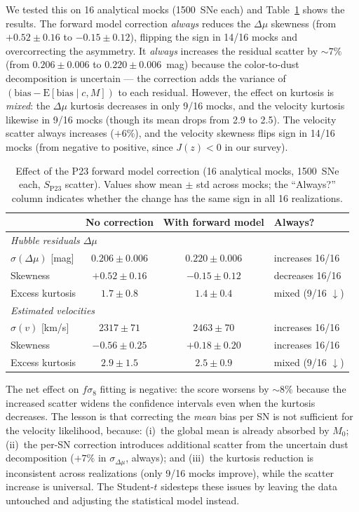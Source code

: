 \documentclass[fleqn,usenatbib]{mnras}
\begin{document}
We tested this on 16 analytical mocks (1500~SNe each) and
Table~\ref{tab:fwd_correction} shows the results. The forward
model correction \emph{always} reduces the $\Delta\mu$ skewness
(from $+0.52 \pm 0.16$ to $-0.15 \pm 0.12$), flipping the sign
in 14/16 mocks and overcorrecting the asymmetry. It \emph{always}
increases the residual scatter by $\sim\!7\%$ (from
$0.206 \pm 0.006$ to $0.220 \pm 0.006$~mag) because the
color-to-dust decomposition is uncertain --- the correction adds
the variance of
$(\mathrm{bias} - \mathrm{E}[\mathrm{bias} \mid c, M])$ to each
residual. However, the effect on kurtosis is \emph{mixed}: the
$\Delta\mu$ kurtosis decreases in only 9/16 mocks, and the
velocity kurtosis likewise in 9/16 mocks (though its mean drops
from 2.9 to 2.5). The velocity scatter always increases
($+6\%$), and the velocity skewness flips sign in 14/16 mocks
(from negative to positive, since $J(z) < 0$ in our survey).

\begin{table}
\centering
\caption{Effect of the P23 forward model correction (16 analytical
mocks, 1500~SNe each, $S_\mathrm{P23}$ scatter). Values show
mean $\pm$ std across mocks; the ``Always?'' column indicates
whether the change has the same sign in all 16 realizations.}
\label{tab:fwd_correction}
\begin{tabular}{lccl}
\toprule
& No correction & With forward model & Always? \\
\midrule
\multicolumn{4}{l}{\emph{Hubble residuals $\Delta\mu$}} \\
$\sigma(\Delta\mu)$ [mag] & $0.206 \pm 0.006$ & $0.220 \pm 0.006$ & increases 16/16 \\
Skewness & $+0.52 \pm 0.16$ & $-0.15 \pm 0.12$ & decreases 16/16 \\
Excess kurtosis & $1.7 \pm 0.8$ & $1.4 \pm 0.4$ & mixed (9/16 $\downarrow$) \\
\midrule
\multicolumn{4}{l}{\emph{Estimated velocities}} \\
$\sigma(v)$ [km/s] & $2317 \pm 71$ & $2463 \pm 70$ & increases 16/16 \\
Skewness & $-0.56 \pm 0.25$ & $+0.18 \pm 0.20$ & increases 16/16 \\
Excess kurtosis & $2.9 \pm 1.5$ & $2.5 \pm 0.9$ & mixed (9/16 $\downarrow$) \\
\bottomrule
\end{tabular}
\end{table}

The net effect on $f\sigma_8$ fitting is negative: the score
worsens by $\sim\!8\%$ because the increased scatter widens
the confidence intervals even when the kurtosis decreases. The
lesson is that correcting the \emph{mean} bias per SN is not
sufficient for the velocity likelihood, because:
(i)~the global mean is already absorbed by $M_0$;
(ii)~the per-SN correction introduces additional scatter from the
uncertain dust decomposition ($+7\%$ in $\sigma_{\Delta\mu}$,
always); and
(iii)~the kurtosis reduction is inconsistent across realizations
(only 9/16 mocks improve), while the scatter increase is
universal. The Student-$t$ sidesteps these issues by leaving the
data untouched and adjusting the statistical model instead.
\end{document}
